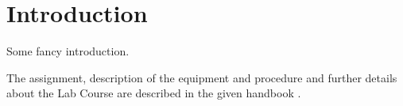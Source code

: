 
\chapter{Introduction}
\label{chap:intro}

Some fancy introduction.

The assignment, description of the equipment and procedure and further details about the Lab Course are described in the given handbook \autocite{brauerApplicationRamanSpectroscopy2022}.